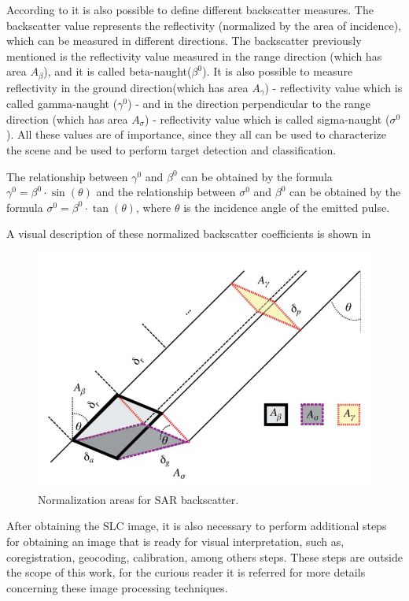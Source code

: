According to \cite{Raney,Small} it is also possible to define different backscatter measures. The backscatter value represents the reflectivity (normalized by the area of incidence), which can be measured in different directions. The backscatter previously mentioned is the reflectivity value measured in the range direction (which has area $A_\beta$), and it is called beta-naught($\beta^0$). It is also possible to measure reflectivity in the ground direction(which has area $A_\gamma$) - reflectivity value which is called gamma-naught ($\gamma^0$) - and in the direction perpendicular to the range direction (which has area $A_\sigma$) - reflectivity value which is called sigma-naught ($\sigma^0$). All these values are of importance, since they all can be used to characterize the scene and be used to perform target detection and classification. 

The relationship between $\gamma^0$ and $\beta^0$ can be obtained by the formula $\gamma^0 = \beta^0 \cdot \sin(\theta)$ and the relationship between $\sigma^0$ and $\beta^0$ can be obtained by the formula $\sigma^0 = \beta^0 \cdot \tan(\theta)$, where $\theta$ is the incidence angle of the emitted pulse.

A visual description of these normalized backscatter coefficients is shown in 

\begin{figure}[H]
    \centering
    \includegraphics[width=0.8\linewidth]{Cap1-Bib Review/retang.png}
    \caption{Normalization areas for SAR backscatter. \cite{Small}}
    \label{fig:normalization_areas}
\end{figure}

After obtaining the SLC image, it is also necessary to perform additional steps for obtaining an image that is ready for visual interpretation, such as, coregistration, geocoding, calibration, among others steps. These steps are outside the scope of this work, for the curious reader it is referred \cite{Alberto} for more details concerning these image processing techniques.

